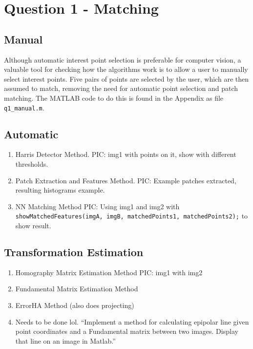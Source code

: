 \documentclass[a4paper, 10pt, conference]{ieeeconf}
\begin{document}
\section{Question 1 - Matching}
\subsection{Manual}

Although automatic interest point selection is preferable for computer vision, a valuable tool for checking how the algorithms work is to allow a user to manually select interest points. Five pairs of points are selected by the user, which are then assumed to match, removing the need for automatic point selection and patch matching. The MATLAB code to do this is found in the Appendix as file \texttt{q1\_manual.m}.


\subsection{Automatic}
\begin{enumerate}
    \item Harris Detector Method. PIC: img1 with points on it, show with different thresholds.
    \item Patch Extraction and Features Method. PIC: Example patches extracted, resulting histograms example.
    \item NN Matching Method PIC: Using img1 and img2 with
    \texttt{showMatchedFeatures(imgA, imgB, matchedPoints1, matchedPoints2);} to show result.
\end{enumerate}

\subsection{Transformation Estimation}
\begin{enumerate}
    \item Homography Matrix Estimation Method PIC: img1 with img2
    \item Fundamental Matrix Estimation Method
    \item ErrorHA Method (also does projecting)
    \item Needs to be done lol. ``Implement a method for calculating epipolar line given point coordinates and a
Fundamental matrix between two images. Display that line on an image in Matlab.''
\end{enumerate}
\end{document}
